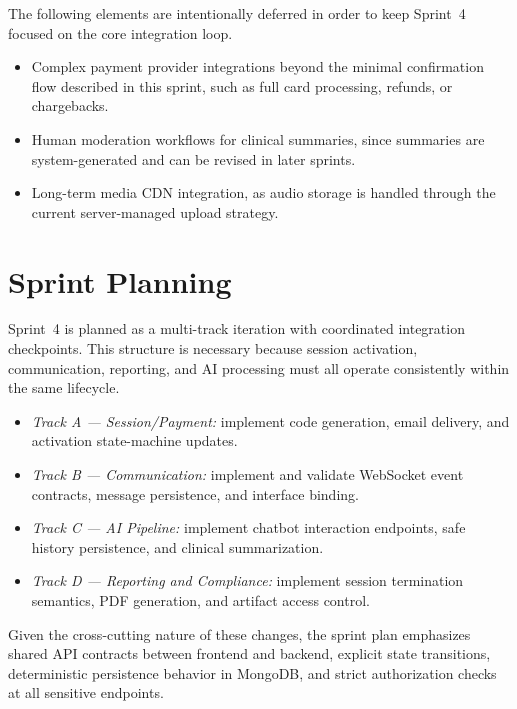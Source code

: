 \documentclass[a4paper,12pt]{report}
\begin{document}
The following elements are intentionally deferred in order to keep Sprint~4 focused on the core integration loop.

\begin{itemize}[leftmargin=*]
  \item[--] Complex payment provider integrations beyond the minimal confirmation flow described in this sprint, such as full card processing, refunds, or chargebacks.
  \item[--] Human moderation workflows for clinical summaries, since summaries are system-generated and can be revised in later sprints.
  \item[--] Long-term media CDN integration, as audio storage is handled through the current server-managed upload strategy.
\end{itemize}

\section{Sprint Planning}
Sprint~4 is planned as a multi-track iteration with coordinated integration checkpoints. This structure is necessary because session activation, communication, reporting, and AI processing must all operate consistently within the same lifecycle.

\begin{itemize}[leftmargin=*]
  \item[--] \emph{Track A --- Session/Payment:} implement code generation, email delivery, and activation state-machine updates.
  \item[--] \emph{Track B --- Communication:} implement and validate WebSocket event contracts, message persistence, and interface binding.
  \item[--] \emph{Track C --- AI Pipeline:} implement chatbot interaction endpoints, safe history persistence, and clinical summarization.
  \item[--] \emph{Track D --- Reporting and Compliance:} implement session termination semantics, PDF generation, and artifact access control.
\end{itemize}

Given the cross-cutting nature of these changes, the sprint plan emphasizes shared API contracts between frontend and backend, explicit state transitions, deterministic persistence behavior in MongoDB, and strict authorization checks at all sensitive endpoints.
\end{document}
